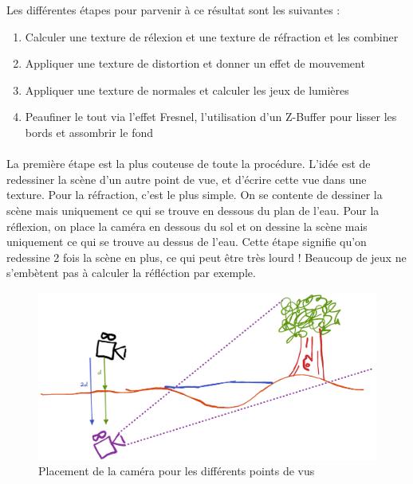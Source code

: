 \documentclass{EPUProjetDi}
\begin{document}
Les différentes étapes pour parvenir à ce résultat sont les suivantes :


\begin{enumerate}
\item Calculer une texture de rélexion et une texture de réfraction et les combiner
\item Appliquer une texture de distortion et donner un effet de mouvement
\item Appliquer une texture de normales et calculer les jeux de lumières
\item Peaufiner le tout via l'effet Fresnel, l'utilisation d'un Z-Buffer pour lisser les bords et assombrir le fond
\end{enumerate}

\paragraph{}
La première étape est la plus couteuse de toute la procédure. L'idée est de redessiner la scène d'un autre point de vue, et d'écrire cette vue dans une texture.
Pour la réfraction, c'est le plus simple. On se contente de dessiner la scène mais uniquement ce qui se trouve en dessous du plan de l'eau.
Pour la réflexion, on place la caméra en dessous du sol et on dessine la scène mais uniquement ce qui se trouve au dessus de l'eau.
Cette étape signifie qu'on redessine 2 fois la scène en plus, ce qui peut être très lourd ! Beaucoup de jeux ne s'embètent pas à calculer la réfléction par exemple.

\begin{figure}[h]
	\centering
	\includegraphics[scale=.3]{water_camera}
	\caption{Placement de la caméra pour les différents points de vus}
	\label{fig:water_camera}
\end{figure}
\end{document}
